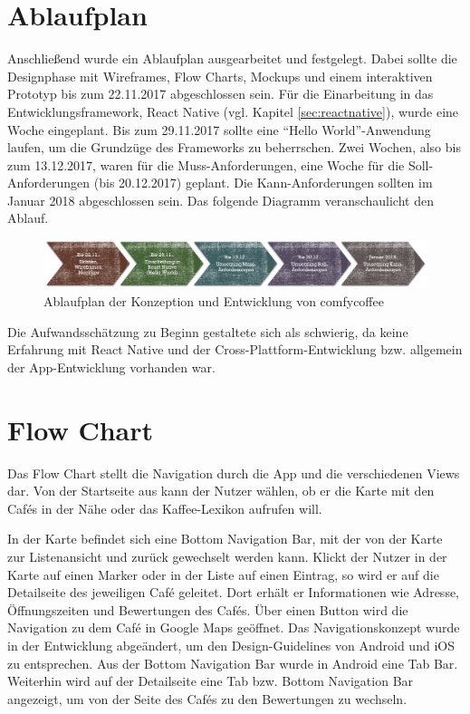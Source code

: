 \section{Ablaufplan}
\label{sec:ablaufplan}
Anschließend wurde ein Ablaufplan ausgearbeitet und festgelegt. Dabei sollte die Designphase mit Wireframes, Flow Charts, Mockups und einem interaktiven Prototyp bis zum 22.11.2017 abgeschlossen sein. Für die Einarbeitung in das Entwicklungsframework, React Native (vgl. Kapitel \ref{sec:reactnative}), wurde eine Woche eingeplant. Bis zum 29.11.2017 sollte eine ``Hello World''-Anwendung laufen, um die Grundzüge des Frameworks zu beherrschen. Zwei Wochen, also bis zum 13.12.2017, waren für die Muss-Anforderungen, eine Woche für die Soll-Anforderungen (bis 20.12.2017) geplant. Die Kann-Anforderungen sollten im Januar 2018 abgeschlossen sein. Das folgende Diagramm veranschaulicht den Ablauf.

\begin{figure}[H]
    \centering
		\includegraphics[width=\textwidth]{Bilder/ablaufplan.png}
		\caption{Ablaufplan der Konzeption und Entwicklung von comfycoffee}
\end{figure}

Die Aufwandsschätzung zu Beginn gestaltete sich als schwierig, da keine Erfahrung mit React Native und der Cross-Plattform-Entwicklung bzw. allgemein der App-Entwicklung vorhanden war.

\section{Flow Chart}
Das Flow Chart stellt die Navigation durch die App und die verschiedenen Views dar. Von der Startseite aus kann der Nutzer wählen, ob er die Karte mit den Cafés in der Nähe oder das Kaffee-Lexikon aufrufen will.

In der Karte befindet sich eine Bottom Navigation Bar, mit der von der Karte zur Listenansicht und zurück gewechselt werden kann. Klickt der Nutzer in der Karte auf einen Marker oder in der Liste auf einen Eintrag, so wird er auf die Detailseite des jeweiligen Café geleitet. Dort erhält er Informationen wie Adresse, Öffnungszeiten und Bewertungen des Cafés. Über einen Button wird die Navigation zu dem Café in Google Maps geöffnet. Das Navigationskonzept wurde in der Entwicklung abgeändert, um den Design-Guidelines von Android und iOS zu entsprechen. Aus der Bottom Navigation Bar wurde in Android eine Tab Bar. Weiterhin wird auf der Detailseite eine Tab bzw. Bottom Navigation Bar angezeigt, um von der Seite des Cafés zu den Bewertungen zu wechseln.

